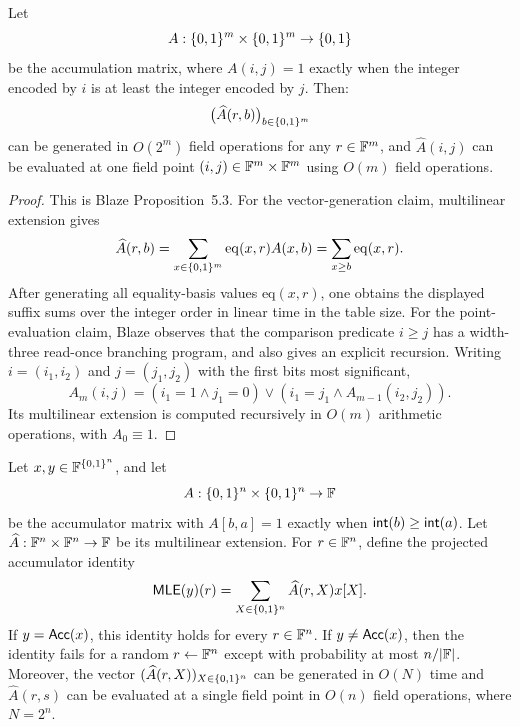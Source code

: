 \begin{proposition}
\label{prop:blaze-accumulation-kernel-replay}
Let
\[
  A:\{0,1\}^m\times\{0,1\}^m\to\{0,1\}
\]
be the accumulation matrix, where \(A(i,j)=1\) exactly when the integer encoded
by \(i\) is at least the integer encoded by \(j\).  Then:
\[
  \bigl(\widehat A(r,b)\bigr)_{b\in\{0,1\}^m}
\]
can be generated in \(O(2^m)\) field operations for any \(r\in\mathbb{F}^m\), and
\(\widehat A(i,j)\) can be evaluated at one field point
\((i,j)\in\mathbb{F}^m\times\mathbb{F}^m\) using \(O(m)\) field operations.
\end{proposition}

\begin{proof}
This is Blaze Proposition~5.3.  For the vector-generation claim, multilinear
extension gives
\[
  \widehat A(r,b)=
  \sum_{x\in\{0,1\}^m}\mathrm{eq}(x,r)A(x,b)
  =
  \sum_{x\ge b}\mathrm{eq}(x,r).
\]
After generating all equality-basis values \(\mathrm{eq}(x,r)\), one obtains
the displayed suffix sums over the integer order in linear time in the table
size.  For the point-evaluation claim, Blaze observes that the comparison
predicate \(i\ge j\) has a width-three read-once branching program, and also
gives an explicit recursion.  Writing \(i=(i_1,i_2)\) and \(j=(j_1,j_2)\) with
the first bits most significant,
\[
  A_m(i,j)=
  (i_1=1\wedge j_1=0)
  \vee
  (i_1=j_1\wedge A_{m-1}(i_2,j_2)).
\]
Its multilinear extension is computed recursively in \(O(m)\) arithmetic
operations, with \(A_0\equiv 1\).
\end{proof}

\begin{proposition}
\label{prop:native-accumulator-reduction}
Let \(x,y\in\mathbb{F}^{\{0,1\}^n}\), and let
\[
  A:\{0,1\}^n\times\{0,1\}^n\to\mathbb{F}
\]
be the accumulator matrix with \(A[b,a]=1\) exactly when
\(\mathsf{int}(b)\ge \mathsf{int}(a)\).  Let
\(\widehat A:\mathbb{F}^n\times\mathbb{F}^n\to\mathbb{F}\) be its multilinear extension.  For
\(r\in\mathbb{F}^n\), define the projected accumulator identity
\[
  \mathsf{MLE}(y)(r)
  =
  \sum_{X\in\{0,1\}^n}\widehat A(r,X)x[X].
\]
If \(y=\mathsf{Acc}(x)\), this identity holds for every \(r\in\mathbb{F}^n\).  If
\(y\ne\mathsf{Acc}(x)\), then the identity fails for a random \(r\leftarrow\mathbb{F}^n\)
except with probability at most \(n/|\mathbb{F}|\).  Moreover, the vector
\((\widehat A(r,X))_{X\in\{0,1\}^n}\) can be generated in \(O(N)\) time and
\(\widehat A(r,s)\) can be evaluated at a single field point in \(O(n)\) field
operations, where \(N=2^n\).
\end{proposition}

